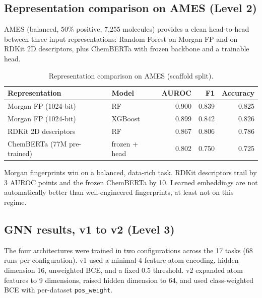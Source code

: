 \documentclass[a4paper,11pt]{article}
\begin{document}
\subsection{Representation comparison on AMES (Level 2)}

AMES (balanced, 50\% positive, 7{,}255 molecules) provides a clean head-to-head between three input representations: Random Forest on Morgan FP and on RDKit 2D descriptors, plus ChemBERTa with frozen backbone and a trainable head.

\begin{table}[H]
\centering
\caption{Representation comparison on AMES (scaffold split).}
\label{tab:repr_ames}
\begin{tabular}{llrrr}
\toprule
\textbf{Representation} & \textbf{Model} & \textbf{AUROC} & \textbf{F1} & \textbf{Accuracy} \\
\midrule
Morgan FP (1024-bit)       & RF                  & 0.900 & 0.839 & 0.825 \\
Morgan FP (1024-bit)       & XGBoost             & 0.899 & 0.842 & 0.826 \\
RDKit 2D descriptors       & RF                  & 0.867 & 0.806 & 0.786 \\
ChemBERTa (77M pre-trained)& frozen + head       & 0.802 & 0.750 & 0.725 \\
\bottomrule
\end{tabular}
\end{table}

Morgan fingerprints win on a balanced, data-rich task. RDKit descriptors trail by 3 AUROC points and the frozen ChemBERTa by 10. Learned embeddings are not automatically better than well-engineered fingerprints, at least not on this regime.

\subsection{GNN results, v1 to v2 (Level 3)}

The four architectures were trained in two configurations across the 17 tasks (68 runs per configuration). v1 used a minimal 4-feature atom encoding, hidden dimension 16, unweighted BCE, and a fixed 0.5 threshold. v2 expanded atom features to 9 dimensions, raised hidden dimension to 64, and used class-weighted BCE with per-dataset \texttt{pos\_weight}.
\end{document}
